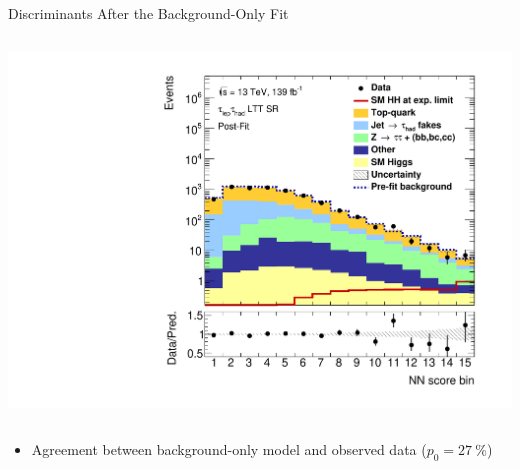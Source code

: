 \documentclass[11pt, xcolor={dvipsnames}, aspectratio=169, notes]{beamer}
\begin{document}
\begin{frame}{Discriminants After the Background-Only Fit}
\begin{columns}
    \centering


    \includegraphics[width=\textwidth, trim=0.5em 0 2.5em 0, clip]{results_nonres/postfit/Region_BMin0_incJet1_distNN_J2_DSM_T2_SpcTauLH_Y2015_LTT1_L1_GlobalFit_conditionnal_mu0log}
  \end{columns}

  \vspace*{0.5em}

  \begin{itemize}
    \setlength{\itemsep}{0.75em}

  \item Agreement between background-only model and observed data
    ($p_0 = \SI{27}{\percent}$)


  \end{itemize}
\end{frame}

\end{document}
